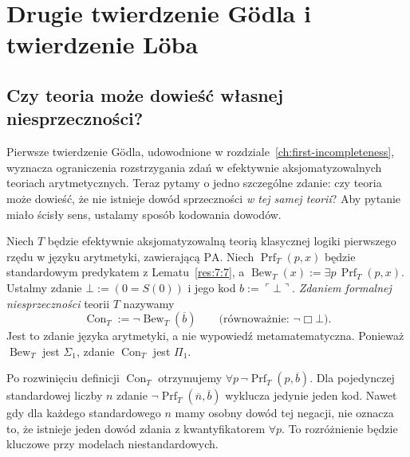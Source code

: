 \chapter{Drugie twierdzenie Gödla i twierdzenie Löba}
\label{ch:second-incompleteness}

\section{Czy teoria może dowieść własnej niesprzeczności?}
Pierwsze twierdzenie Gödla, udowodnione w rozdziale~\ref{ch:first-incompleteness},
wyznacza ograniczenia rozstrzygania zdań w efektywnie aksjomatyzowalnych
teoriach arytmetycznych. Teraz pytamy o jedno szczególne zdanie:
czy teoria może dowieść, że nie istnieje dowód sprzeczności
\emph{w tej samej teorii}? Aby pytanie miało ścisły sens,
ustalamy sposób kodowania dowodów.

\begin{definicja}\label{def:con-t}
Niech $T$ będzie efektywnie aksjomatyzowalną teorią klasycznej logiki
pierwszego rzędu w języku arytmetyki, zawierającą $\mathrm{PA}$.
Niech $\operatorname{Prf}_T(p,x)$ będzie standardowym predykatem
z Lematu~\ref{res:7:7}, a
$\operatorname{Bew}_T(x):=\exists p\,\operatorname{Prf}_T(p,x)$.
Ustalmy zdanie $\bot:=(0=S(0))$ i jego kod $b:=\ulcorner\bot\urcorner$.
\emph{Zdaniem formalnej niesprzeczności} teorii $T$ nazywamy
\[
\operatorname{Con}_T:=
\neg\operatorname{Bew}_T(\overline b)
\qquad\text{(równoważnie: }\neg\Box\bot\text{)}.
\]
Jest to zdanie języka arytmetyki, a nie wypowiedź
metamatematyczna. Ponieważ $\operatorname{Bew}_T$ jest $\Sigma_1$,
zdanie $\operatorname{Con}_T$ jest $\Pi_1$.
\end{definicja}

\begin{przyklad}
Po rozwinięciu definicji $\operatorname{Con}_T$ otrzymujemy
$\forall p\,\neg\operatorname{Prf}_T(p,\overline b)$.
Dla pojedynczej standardowej liczby $n$ zdanie
$\neg\operatorname{Prf}_T(\overline n,\overline b)$ wyklucza jedynie
jeden kod. Nawet gdy dla każdego standardowego $n$ mamy osobny
dowód tej negacji, nie oznacza to, że istnieje jeden dowód
zdania z kwantyfikatorem $\forall p$. To rozróżnienie będzie
kluczowe przy modelach niestandardowych.
\end{przyklad}


